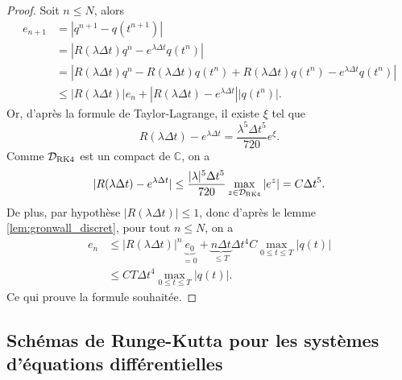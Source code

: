 \begin{proof}
Soit $n \leq N$, alors
\begin{align*}
e_{n+1} & = |q^{n+1} - q(t^{n+1})| \\
	& = |R(\lambda \Delta t) q^n - e^{\lambda \Delta t}q(t^n)| \\
	& = |R(\lambda \Delta t) q^n - R(\lambda \Delta t) q(t^n) + R(\lambda \Delta t) q(t^n)- e^{\lambda \Delta t}q(t^n)| \\
	& \leq |R(\lambda \Delta t)| e_n + |R(\lambda \Delta t) - e^{\lambda \Delta t}| |q(t^n)|.
\end{align*}
Or, d'après la formule de Taylor-Lagrange, il existe $\xi$ tel que
\begin{equation}
R(\lambda \Delta t) - e^{\lambda \Delta t} = \dfrac{\lambda^5 \Delta t^5}{720} e^{\xi}.
\end{equation}
Comme $\mathcal{D}_{\RK4}$ est un compact de $\mathbb{C}$, on a
\begin{align*}
|R(\lambda \Delta t) - e^{\lambda \Delta t}| \leq \dfrac{|\lambda|^5 \Delta t^5}{720} \max_{z \in \mathcal{D}_{\RK4}} |e^z| = C \Delta t^5.
\end{align*}
De plus, par hypothèse $|R(\lambda \Delta t)| \leq 1$, donc d'après le lemme \ref{lem:gronwall_discret}, pour tout $n \leq N$, on a
\begin{align*}
e_n & \leq |R(\lambda \Delta t)|^n \underbrace{e_0}_{=0} + \underbrace{n \Delta t}_{\leq T} \Delta t^4 C \max_{0 \leq t \leq T} |q(t)| \\
	& \leq CT \Delta t^4 \max_{0 \leq t \leq T} |q(t)|.
\end{align*}
Ce qui prouve la formule souhaitée.
\end{proof}




\subsection{Schémas de Runge-Kutta pour les systèmes d'équations différentielles}

